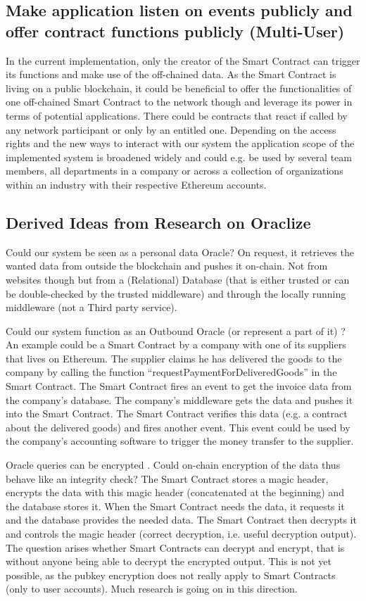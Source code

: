 \subsection{Make application listen on events publicly and offer contract functions publicly (Multi-User)}
In the current implementation, only the creator of the Smart Contract can trigger its functions and make use of the off-chained data. As the Smart Contract is living on a public blockchain, it could be beneficial to offer the functionalities of one off-chained Smart Contract to the network though and leverage its power in terms of potential applications. There could be contracts that react if called by any network participant or only by an entitled one. Depending on the access rights and the new ways to interact with our system the application scope of the implemented system is broadened widely and could e.g. be used by several team members, all departments in a company or across a collection of organizations within an industry with their respective Ethereum accounts.

\subsection{Derived Ideas from Research on Oraclize}
Could our system be seen as a personal data Oracle? On request, it retrieves the wanted data from outside the blockchain and pushes it on-chain. Not from websites though but from a (Relational) Database (that is either trusted or can be double-checked by the trusted middleware) and through the locally running middleware (not a Third party service).

Could our system function as an Outbound Oracle (or represent a part of it) \cite{relatedWork01}?
An example could be a Smart Contract by a company with one of its suppliers that lives on Ethereum. The supplier claims he has delivered the goods to the company by calling the function “requestPaymentForDeliveredGoods” in the Smart Contract. The Smart Contract fires an event to get the invoice data from the company’s database. The company’s middleware gets the data and pushes it into the Smart Contract. The Smart Contract verifies this data (e.g. a contract about the delivered goods) and fires another event. This event could be used by the company’s accounting software to trigger the money transfer to the supplier.

Oracle queries can be encrypted \cite{futureWork01}. Could on-chain encryption of the data thus behave like an integrity check? The Smart Contract stores a magic header, encrypts the data with this magic header (concatenated at the beginning) and the database stores it.
When the Smart Contract needs the data, it requests it and the database provides the needed data. The Smart Contract then decrypts it and controls the magic header (correct decryption, i.e. useful decryption output).
The question arises whether Smart Contracts can decrypt and encrypt, that is without anyone being able to decrypt the encrypted output. This is not yet possible, as the pubkey encryption does not really apply to Smart Contracts (only to user accounts). Much research is going on in this direction.

